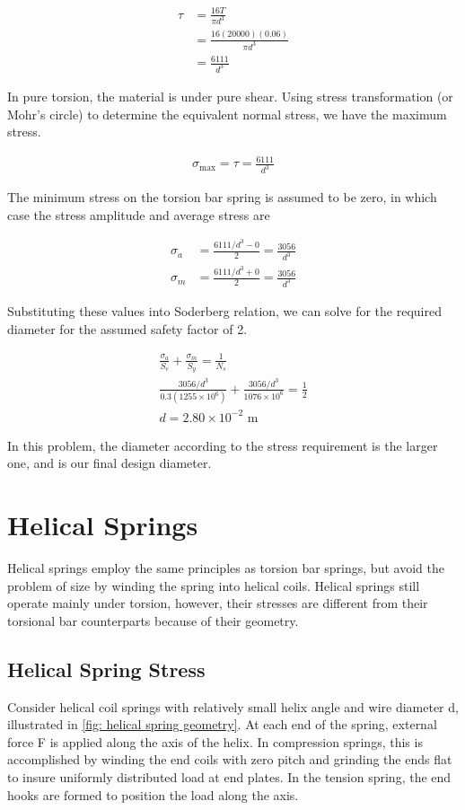 \documentclass[a4paper,openany,12pt]{book}
\begin{document}
{{$$\begin{aligned}
    \tau  &= \frac{16T}{\pi d^3} \\
          &= \frac{16(20000)(0.06)}{\pi d^3} \\
          &= \frac{6111}{d^3}
  \end{aligned}$$

In pure torsion, the material is under pure shear. Using stress
transformation (or Mohr's circle) to determine the equivalent normal
stress, we have the maximum stress.

$$\begin{gathered}
    \sigma_{\max} = \tau = \frac{6111}{d^3}
  \end{gathered}$$

The minimum stress on the torsion bar spring is assumed to be zero, in
which case the stress amplitude and average stress are

$$\begin{aligned}
    \sigma_a &= \frac{6111/d^3 - 0}{2} = \frac{3056}{d^3} \\
    \sigma_m &= \frac{6111/d^3 + 0}{2} = \frac{3056}{d^3}
  \end{aligned}$$

Substituting these values into Soderberg relation, we can solve for the
required diameter for the assumed safety factor of 2.

$$\begin{gathered}
    \frac{\sigma_a}{S_e} + \frac{\sigma_m}{S_y} = \frac{1}{N_s} \\
    \frac{3056/d^3}{0.3(1255 \times 10^6)} + \frac{3056/d^3}{1076 \times 10^6} = \frac{1}{2} \\
    d = 2.80 \times 10^{-2} \text{ m}
  \end{gathered}$$

In this problem, the diameter according to the stress requirement is the
larger one, and is our final design diameter.

\section{Helical Springs}
\label{helical-springs}
Helical springs employ the same principles as torsion bar springs, but
avoid the problem of size by winding the spring into helical coils.
Helical springs still operate mainly under torsion, however, their
stresses are different from their torsional bar counterparts because of
their geometry.

\subsection{Helical Spring Stress}
\label{helical-spring-stress}
Consider helical coil springs with relatively small helix angle and wire
diameter d, illustrated in
\ref{fig: helical spring geometry}. At
each end of the spring, external force F is applied along the axis of
the helix. In compression springs, this is accomplished by winding the
end coils with zero pitch and grinding the ends flat to insure uniformly
distributed load at end plates. In the tension spring, the end hooks are
formed to position the load along the axis.


}}
\end{document}
